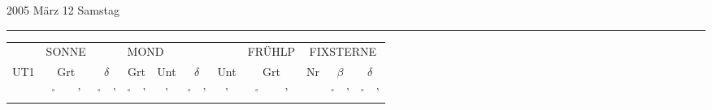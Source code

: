 \documentclass[a4paper]{article}
\begin{document}

{\Large 2005 \hspace{1cm} März \hspace{1cm} 12 \hspace{1cm} Samstag}
\hrule 
\vspace{0.5cm}

\begin{center}
    {\small
    \begin{tabular}{ c | c c | c c | c c | c | c c | c | c c | c | c c | c c}
    
    \rowcolor{gray} & \multicolumn{2}{l}{SONNE} & \multicolumn{2}{l|}{} & \multicolumn{6}{l|}{MOND} & \multicolumn{2}{l|}{FRÜHLP} & \multicolumn{5}{c}{FIXSTERNE} \\ 
    \rowcolor{gray} UT1 & \multicolumn{2}{c}{Grt} & \multicolumn{2}{c|}{$\delta$} & \multicolumn{2}{c}{Grt} & Unt & \multicolumn{2}{c|}{$\delta$} & Unt & \multicolumn{2}{c|}{Grt} & Nr & \multicolumn{2}{c}{$\beta$} & \multicolumn{2}{c}{$\delta$} \\
    \rowcolor{gray} & $^\circ$ & ' & $^\circ$ & ' & $^\circ$ & ' & ' & $^\circ$ & ' & ' & $^\circ$ & ' &  & $^\circ$ & ' & $^\circ$ & ' \\
    

\end{tabular}}
\end{center}
\end{document}
